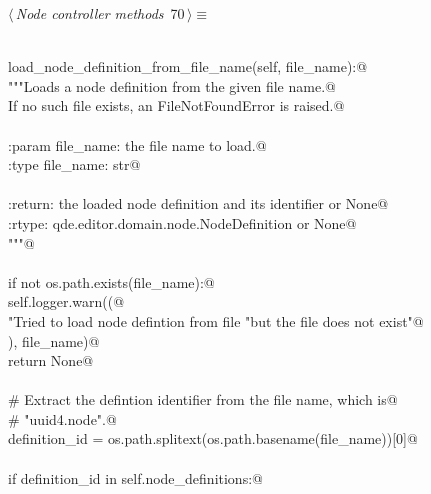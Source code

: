 \documentclass[
    a4paper,      %
    10pt,         %
    openright,    %
    notitlepage,  %
    parskip=half, %
]{scrreprt}       %
\theoremstyle{definition}                    %
\begin{document}
\begin{flushleft} \small
\begin{minipage}{\linewidth}\label{scrap115}\raggedright\small
{} $\langle\,${\itshape Node controller methods}\nobreak\ {\footnotesize {70}}$\,\rangle\equiv$
\vspace{-1exm}
\begin{list}{}{} \item
\mbox{}\lstinline@@\\
\mbox{}\lstinline@def load_node_definition_from_file_name(self, file_name):@\\
\mbox{}\lstinline@    """Loads a node definition from the given file name.@\\
\mbox{}\lstinline@    If no such file exists, an FileNotFoundError is raised.@\\
\mbox{}\lstinline@@\\
\mbox{}\lstinline@    :param file_name: the file name to load.@\\
\mbox{}\lstinline@    :type  file_name: str@\\
\mbox{}\lstinline@@\\
\mbox{}\lstinline@    :return: the loaded node definition and its identifier or None@\\
\mbox{}\lstinline@    :rtype:  qde.editor.domain.node.NodeDefinition or None@\\
\mbox{}\lstinline@    """@\\
\mbox{}\lstinline@@\\
\mbox{}\lstinline@    if not os.path.exists(file_name):@\\
\mbox{}\lstinline@        self.logger.warn((@\\
\mbox{}\lstinline@            "Tried to load node defintion from file %s, "@\\
\mbox{}\lstinline@            "but the file does not exist"@\\
\mbox{}\lstinline@        ), file_name)@\\
\mbox{}\lstinline@        return None@\\
\mbox{}\lstinline@@\\
\mbox{}\lstinline@    # Extract the defintion identifier from the file name, which is@\\
\mbox{}\lstinline@    # "uuid4.node".@\\
\mbox{}\lstinline@    definition_id = os.path.splitext(os.path.basename(file_name))[0]@\\
\mbox{}\lstinline@@\\
\mbox{}\lstinline@    if definition_id in self.node_definitions:@\\

\end{list}
\end{minipage}
\end{flushleft}
\end{document}
